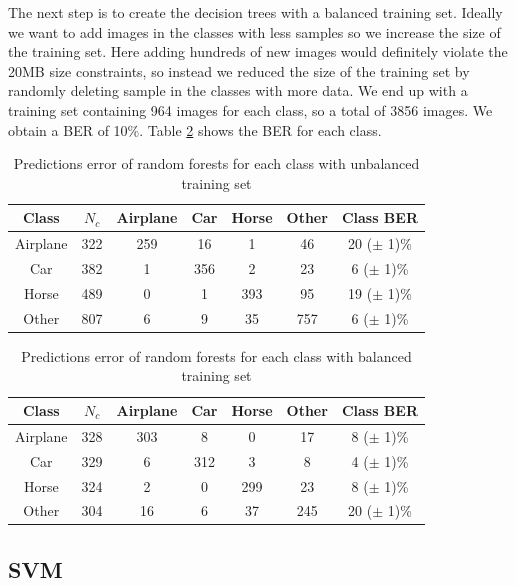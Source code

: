 \documentclass{article} %
\begin{document}
The next step is to create the decision trees with a balanced training set. Ideally we want to add images in the classes with less samples so we increase the size of the training set.
Here adding hundreds of new images would definitely violate the 20MB size constraints, so instead we reduced the size of the training set by randomly deleting sample in the classes with more data. 
We end up with a training set containing 964 images for each class, so a total of 3856 images. 
We obtain a BER of 10\%. Table \ref{tbl:errClassBal} shows the BER for each class.

\begin{table}[!htb]
	\centering
		\begin{tabular}{|c|c|c|c|c|c|c|}
			\hline Class & $N_{c}$ & Airplane & Car & Horse & Other & Class BER \\ 
			\hline Airplane    & 322 & 259 & 16 & 1 & 46 & 20 ($\pm$ 1)\% \\ 
			\hline Car 			 & 382 & 1 & 356 & 2 & 23 & 6 ($\pm$ 1)\% \\ 
			\hline Horse       & 489 & 0 & 1 & 393 & 95 & 19 ($\pm$ 1)\% \\ 
			\hline Other       & 807 & 6 & 9 & 35 & 757 & 6 ($\pm$ 1)\% \\ 
			\hline 
		\end{tabular} 
		\caption{Predictions error of random forests for each class with unbalanced training set}
		\label{tbl:errClassNotBal}
\end{table}

\begin{table}
	\centering
	\begin{tabular}{|c|c|c|c|c|c|c|}
		\hline Class 		 & $N_{c}$ & Airplane & Car & Horse & Other & Class BER \\ 
		\hline Airplane 	& 328 & 303 & 8 & 0 & 17 & 8 ($\pm$ 1)\% \\ 
		\hline Car 			  & 329 & 6 & 312 & 3 & 8 & 4 ($\pm$ 1)\% \\ 
		\hline Horse		& 324 & 2 & 0 & 299 & 23 & 8 ($\pm$ 1)\% \\ 
		\hline Other 	    & 304 & 16 & 6 & 37 & 245 & 20 ($\pm$ 1)\% \\ 
		\hline 
	\end{tabular} 
	\caption{Predictions error of random forests for each class with balanced training set}
	\label{tbl:errClassBal}
\end{table}


\subsection{SVM}
\end{document}

